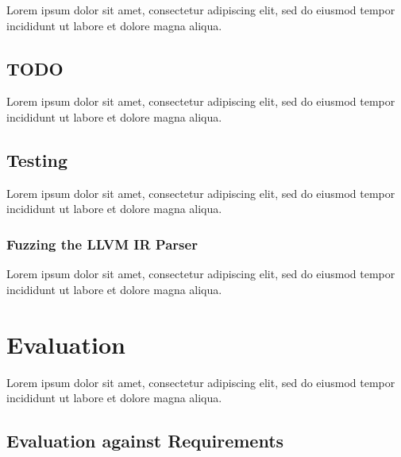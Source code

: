 \documentclass[12pt, a4paper]{article}
\begin{document}
Lorem ipsum dolor sit amet, consectetur adipiscing elit, sed do eiusmod tempor incididunt ut labore et dolore magna aliqua.


\subsection{TODO}

Lorem ipsum dolor sit amet, consectetur adipiscing elit, sed do eiusmod tempor incididunt ut labore et dolore magna aliqua.


\subsection{Testing}

Lorem ipsum dolor sit amet, consectetur adipiscing elit, sed do eiusmod tempor incididunt ut labore et dolore magna aliqua.


\subsubsection{Fuzzing the LLVM IR Parser}

Lorem ipsum dolor sit amet, consectetur adipiscing elit, sed do eiusmod tempor incididunt ut labore et dolore magna aliqua.



\section{Evaluation}

Lorem ipsum dolor sit amet, consectetur adipiscing elit, sed do eiusmod tempor incididunt ut labore et dolore magna aliqua.


\subsection{Evaluation against Requirements}
\end{document}
